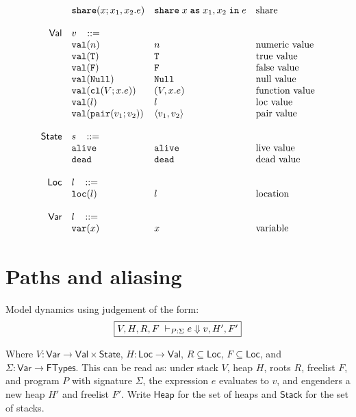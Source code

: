 \documentclass[11pt]{article}
\newcommand{\ms}[1]{\ensuremath{\mathsf{#1}}}
\newcommand{\irl}[1]{\mathtt{#1}}
\newcommand{\sharecst}[4]{\irl{share}\;#1\;\irl{as}\;#2,#3\;\irl{in}\;#4}
\newcommand{\shareabt}[4]{\irl{share}(#1;#2,#3.#4)}
\theoremstyle{definition}
\begin{document}
\[\begin{array}{r l l l l}
  & \shareabt{x}{x_1}{x_2}{e} &\sharecst{x}{x_1}{x_2}{e} &\text{share}\\
  \\
\ms{Val}
        & v   \,\,\,\,\, ::= \\
 	& \irl{val}(n)                                			& n 												& \text{numeric value}\\
 	& \irl{val}(\irl{T})                               			& \irl{T} 								  & \text{true value}\\
 	& \irl{val}(\irl{F})                                			& \irl{F}								  & \text{false value}\\
 	& \irl{val}(\irl{Null})                                  & \irl{Null} 								  & \text{null value}\\
 	& \irl{val}(\irl{cl}(V; x.e))                & (V, x.e) 					& \text{function value}\\
 	& \irl{val}(l)                                			& l 								  & \text{loc value}\\
 	& \irl{val}(\pairexabt{v_1}{v_2})                             & \pairexcst{v_1}{v_2} 								  & \text{pair value}\\
  \\
\ms{State} & s   \,\,\,\,\, ::= \\
 	& \irl{alive}                                			& \irl{alive} 												& \text{live value}\\
 	& \irl{dead}                                			& \irl{dead} 												& \text{dead value}\\\\
\ms{Loc} & l   \,\,\,\,\, ::= \\
 	& \irl{loc}(l)                                			& l 												& \text{location}\\\\
\ms{Var} & l   \,\,\,\,\, ::= \\
 	& \irl{var}(x)                                			& x 												& \text{variable}\\
\end{array}
\]

\newpage
\section{Paths and aliasing}

Model dynamics using judgement of the form:
\[
\fbox{$V,H,R,F \; \vdash_{P : \Sigma} e \Downarrow v, H', F'$}
\]

\noindent
Where $V : \ms{Var} \to \ms{Val} \times \ms{State}$, $H : \ms{Loc} \to \ms{Val}$, $R \subseteq \ms{Loc}$, $F \subseteq \ms{Loc}$, and $\Sigma : \ms{Var} \to \ms{FTypes}$. This can be read as: under stack $V$, heap $H$, roots $R$,
freelist $F$, and program $P$ with signature $\Sigma$, the expression $e$ evaluates to $v$, and engenders a new heap $H'$ and freelist $F'$. Write $\ms{Heap}$ for the set of heaps and $\ms{Stack}$ for the set of stacks.\\
\end{document}

